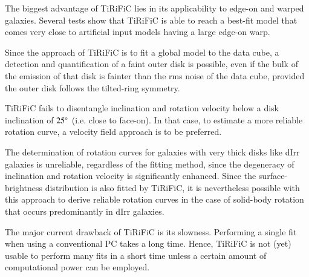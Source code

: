 \documentclass[oldversion]{aa}
\renewcommand{\deg}{\hbox{$^\circ$}}
\newcommand{\cng}[1]{{#1}}
\begin{document}
The biggest advantage of TiRiFiC lies in its applicability to edge-on
and warped galaxies. Several tests show that TiRiFiC is able to reach
a best-fit model that comes very close to artificial input models
having a large \cng{edge-on} warp.

\cng{Since the approach of TiRiFiC is to fit a global model to the data
cube, a detection and quantification of a faint outer disk is possible,
even if the bulk of the emission of that disk is fainter than the rms
noise of the data cube, provided the outer disk follows the tilted-ring symmetry.

TiRiFiC fails to disentangle inclination and rotation velocity below a
disk inclination of $25\deg$ (i.e. close to face-on). In that case, to estimate a more
reliable rotation curve, a velocity field approach is to be
preferred.

The determination of rotation curves for galaxies with very thick disks like
dIrr galaxies is unreliable, regardless of the fitting method, since
the degeneracy of inclination and rotation velocity is significantly
enhanced. Since the surface-brightness distribution is also fitted by
TiRiFiC, it is nevertheless possible with this approach to derive reliable rotation curves in the case
of solid-body rotation that occurs predominantly in dIrr galaxies.}

The major \cng{current} drawback of TiRiFiC is its slowness. Performing a
single fit when using a conventional PC takes a long time. Hence,
TiRiFiC is not (yet) usable to perform many fits in a short time
unless a certain amount of computational power can be employed.
\end{document}
